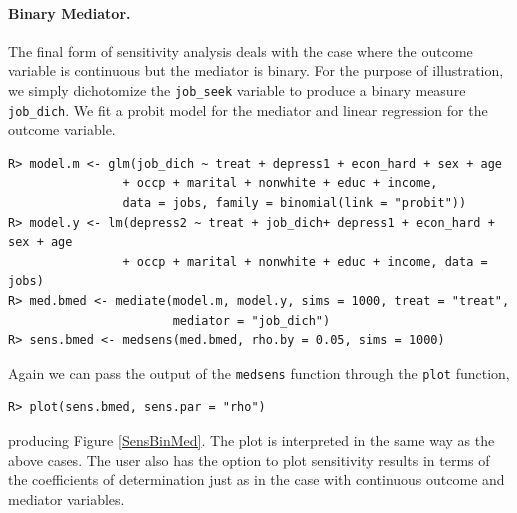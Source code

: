 \documentclass[11pt,letterpaper]{article}
\theoremstyle{plain}
\begin{document}
\paragraph{Binary Mediator.}
The final form of sensitivity analysis deals with the case where the
outcome variable is continuous but the mediator is binary.  For the
purpose of illustration, we simply dichotomize the \texttt{job\_seek}
variable to produce a binary measure \texttt{job\_dich}. We fit a
probit model for the mediator and linear regression for the outcome
variable.
\begin{verbatim}
R> model.m <- glm(job_dich ~ treat + depress1 + econ_hard + sex + age 
                + occp + marital + nonwhite + educ + income, 
                data = jobs, family = binomial(link = "probit"))
R> model.y <- lm(depress2 ~ treat + job_dich+ depress1 + econ_hard + sex + age 
                + occp + marital + nonwhite + educ + income, data = jobs)
R> med.bmed <- mediate(model.m, model.y, sims = 1000, treat = "treat",
                       mediator = "job_dich")
R> sens.bmed <- medsens(med.bmed, rho.by = 0.05, sims = 1000)
\end{verbatim}
Again we can pass the output of the \texttt{medsens} function through the \texttt{plot} function,
\begin{verbatim}
R> plot(sens.bmed, sens.par = "rho")
\end{verbatim}
producing Figure \ref{SensBinMed}. The plot is interpreted in the same
way as the above cases. The user also has the option to plot sensitivity results
in terms of the coefficients of determination just as in the case with
continuous outcome and mediator variables.
\end{document}
